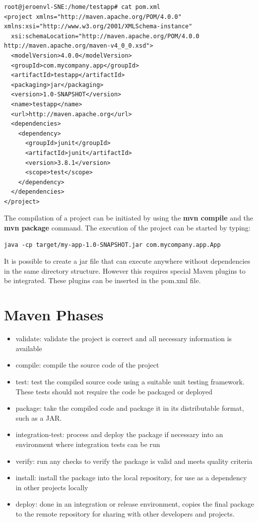 \begin{verbatim}
root@jeroenvl-SNE:/home/testapp# cat pom.xml 
<project xmlns="http://maven.apache.org/POM/4.0.0" xmlns:xsi="http://www.w3.org/2001/XMLSchema-instance"
  xsi:schemaLocation="http://maven.apache.org/POM/4.0.0 http://maven.apache.org/maven-v4_0_0.xsd">
  <modelVersion>4.0.0</modelVersion>
  <groupId>com.mycompany.app</groupId>
  <artifactId>testapp</artifactId>
  <packaging>jar</packaging>
  <version>1.0-SNAPSHOT</version>
  <name>testapp</name>
  <url>http://maven.apache.org</url>
  <dependencies>
    <dependency>
      <groupId>junit</groupId>
      <artifactId>junit</artifactId>
      <version>3.8.1</version>
      <scope>test</scope>
    </dependency>
  </dependencies>
</project>
\end{verbatim}

The compilation of a project can be initiated by using the \textbf{mvn compile} and the \textbf{mvn package} command.
The execution of the project can be started by typing:

\begin{verbatim}
java -cp target/my-app-1.0-SNAPSHOT.jar com.mycompany.app.App 
\end{verbatim}

It is possible to create a jar file that can execute anywhere without dependencies in the same directory structure. However this requires special Maven plugins to be integrated. These plugins can be inserted in the pom.xml file. 

\section{Maven Phases}

\begin{itemize}
	\item validate: validate the project is correct and all necessary information is available
	\item compile: compile the source code of the project
	\item test: test the compiled source code using a suitable unit testing framework. These tests should not require the code be packaged or deployed
	\item package: take the compiled code and package it in its distributable format, such as a JAR.
	\item integration-test: process and deploy the package if necessary into an environment where integration tests can be run
	\item verify: run any checks to verify the package is valid and meets quality criteria
	\item install: install the package into the local repository, for use as a dependency in other projects locally
	\item deploy: done in an integration or release environment, copies the final package to the remote repository for sharing with other developers and projects.
\end{itemize}
\newpage


